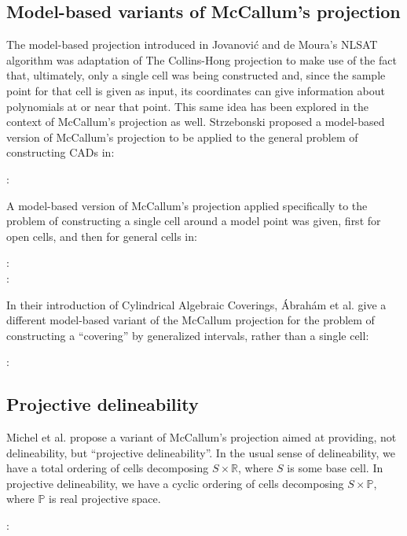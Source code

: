 \documentclass{article}
\newcommand{\realring}{\mathbb{R}}
\begin{document}
\subsection{Model-based variants of McCallum's projection}
The model-based projection introduced in
Jovanovi\'c and de Moura's NLSAT algorithm was adaptation of
The Collins-Hong projection to make use of the fact that, ultimately,
only a single cell was being constructed and, since the sample point
for that cell is given as input, its coordinates can give information
about polynomials at or near that point.
This same idea has been explored in the context of McCallum's
projection as well.  Strzebonski proposed a model-based version of
McCallum's projection to be applied to the general problem of
constructing CADs in:
%
\begin{description}
\item[\autocite{Strzebonski:2014} :]  
\end{description}
%
A model-based version of McCallum's projection applied specifically to
the problem of constructing a single cell around a model point was
given, first for open cells, and then for general cells in:
\begin{description}
\item[\autocite{Brown:2013} :]  
\item[\autocite{BrownKosta:2014} :]  
\end{description}
%
In their introduction of Cylindrical Algebraic Coverings,
{\'A}brah{\'a}m et al. give a different model-based variant of the
McCallum projection for the problem of constructing a ``covering'' by
generalized intervals, rather than a single cell:
\begin{description}
\item[\autocite{AbrahamEtAl:2021} :]  
\end{description}
%


\subsection{Projective delineability}
Michel et al. propose a variant of McCallum's projection aimed at
providing, not delineability, but ``projective delineability''.
In the usual sense of delineability, we have a total ordering of cells
decomposing $S\times\realring$, where $S$ is some base cell.  In
projective delineability, we have 
a cyclic ordering of cells decomposing $S\times\mathbb{P}$, where
$\mathbb{P}$ is real projective space.
%
\begin{description}
\item[\autocite{MichelEtAl:2024} :]  
\end{description}
%
\end{document}
